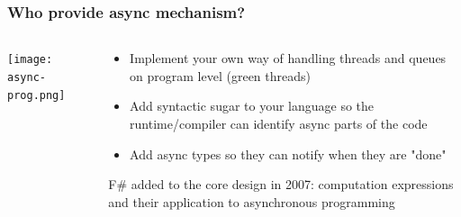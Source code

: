\begin{frame}[fragile]	
    \frametitle{Who provide async mechanism?}
    \begin{columns}
        \begin{column}{.4\textwidth}
            \centering
            
            \texttt{[image: async-prog.png]}
            
            
        \end{column}
        
        \begin{column}{.6\textwidth}
            \begin{itemize}
                
                \item Implement your own way of handling threads and queues on program level (green threads)
                \item Add syntactic sugar to your language so the runtime/compiler can identify async parts of the code
                \item Add async types so they can notify when they are "done"
                
            \end{itemize}
             F\# added to the core design in 2007: computation expressions and their application to asynchronous programming
        \end{column}
    \end{columns}
\end{frame}


